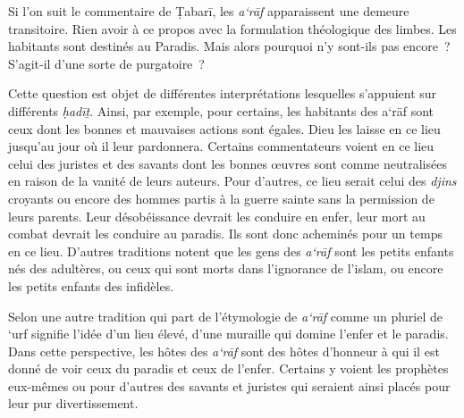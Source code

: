 Si l'on suit le commentaire de Ṭabarī, les \emph{a`rāf} apparaissent une
demeure transitoire. Rien avoir à ce propos avec la formulation
théologique des limbes. Les habitants sont destinés au Paradis. Mais
alors pourquoi n'y sont-ils pas encore~? S'agit-il d'une sorte de
purgatoire~?

Cette question est objet de différentes interprétations lesquelles
s'appuient sur différents \emph{ḥadīṯ}. Ainsi, par exemple, pour
certains, les habitants des a`rāf sont ceux dont les bonnes et mauvaises
actions sont égales. Dieu les laisse en ce lieu jusqu'au jour où il leur
pardonnera. Certains commentateurs voient en ce lieu celui des juristes
et des savants dont les bonnes œuvres sont comme neutralisées en raison
de la vanité de leurs auteurs. Pour d'autres, ce lieu serait celui des
\emph{djins} croyants ou encore des hommes partis à la guerre sainte
sans la permission de leurs parents. Leur désobéissance devrait les
conduire en enfer, leur mort au combat devrait les conduire au paradis.
Ils sont donc acheminés pour un temps en ce lieu. D'autres traditions
notent que les gens des \emph{a`rāf} sont les petits enfants nés des
adultères, ou ceux qui sont morts dans l'ignorance de l'islam, ou encore
les petits enfants des infidèles.

Selon une autre tradition qui part de l'étymologie de \emph{a`rāf} comme
un pluriel de `urf signifie l'idée d'un lieu élevé, d'une muraille qui
domine l'enfer et le paradis. Dans cette perspective, les hôtes des
\emph{a`rāf} sont des hôtes d'honneur à qui il est donné de voir ceux du
paradis et ceux de l'enfer. Certains y voient les prophètes eux-mêmes ou
pour d'autres des savants et juristes qui seraient ainsi placés pour
leur pur divertissement.



